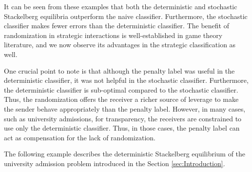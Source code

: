 It can be seen from these examples that both the deterministic and stochastic Stackelberg equilibria outperform the naive classifier. Furthermore, the stochastic classifier makes fewer errors than the deterministic classifier. The benefit of randomization in strategic interactions is well-established in game theory literature, and we now observe its advantages in the strategic classification as well.

One crucial point to note is that although the penalty label was useful in the deterministic classifier, it was not helpful in the stochastic classifier. Furthermore, the deterministic classifier is sub-optimal compared to the stochastic classifier. Thus, the randomization offers the receiver a richer source of leverage to make the sender behave appropriately than the penalty label. However, in many cases, such as university admissions, for transparency, the receivers are constrained to use only the deterministic classifier. Thus, in those cases, the penalty label can act as compensation for the lack of randomization.

The following example describes the deterministic Stackelberg equilibrium of the university admission problem introduced in the Section \ref{sec:Introduction}.


